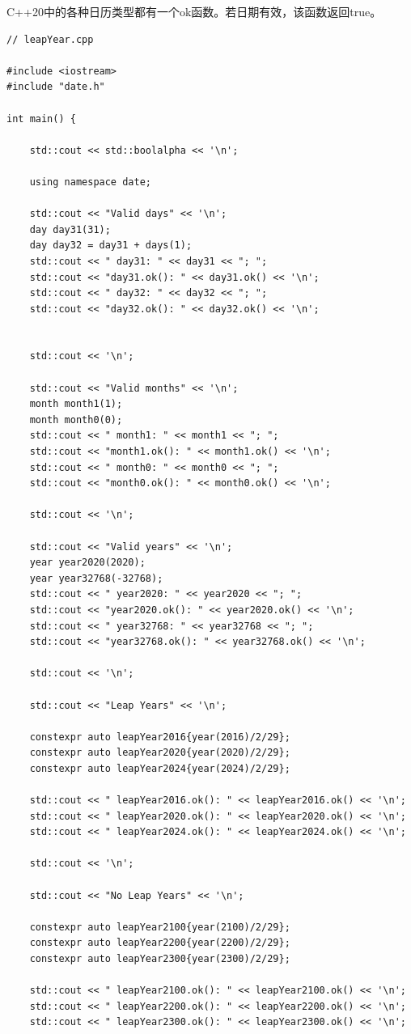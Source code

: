 C++20中的各种日历类型都有一个ok函数。若日期有效，该函数返回true。

\begin{lstlisting}[style=styleCXX]
// leapYear.cpp

#include <iostream>
#include "date.h"

int main() {
	
	std::cout << std::boolalpha << '\n';
	
	using namespace date;
	
	std::cout << "Valid days" << '\n';
	day day31(31);
	day day32 = day31 + days(1);
	std::cout << " day31: " << day31 << "; ";
	std::cout << "day31.ok(): " << day31.ok() << '\n';
	std::cout << " day32: " << day32 << "; ";
	std::cout << "day32.ok(): " << day32.ok() << '\n';
	
	
	std::cout << '\n';
	
	std::cout << "Valid months" << '\n';
	month month1(1);
	month month0(0);
	std::cout << " month1: " << month1 << "; ";
	std::cout << "month1.ok(): " << month1.ok() << '\n';
	std::cout << " month0: " << month0 << "; ";
	std::cout << "month0.ok(): " << month0.ok() << '\n';
	
	std::cout << '\n';
	
	std::cout << "Valid years" << '\n';
	year year2020(2020);
	year year32768(-32768);
	std::cout << " year2020: " << year2020 << "; ";
	std::cout << "year2020.ok(): " << year2020.ok() << '\n';
	std::cout << " year32768: " << year32768 << "; ";
	std::cout << "year32768.ok(): " << year32768.ok() << '\n';
	
	std::cout << '\n';
	
	std::cout << "Leap Years" << '\n';
	
	constexpr auto leapYear2016{year(2016)/2/29};
	constexpr auto leapYear2020{year(2020)/2/29};
	constexpr auto leapYear2024{year(2024)/2/29};
	
	std::cout << " leapYear2016.ok(): " << leapYear2016.ok() << '\n';
	std::cout << " leapYear2020.ok(): " << leapYear2020.ok() << '\n';
	std::cout << " leapYear2024.ok(): " << leapYear2024.ok() << '\n';
	
	std::cout << '\n';
	
	std::cout << "No Leap Years" << '\n';
	
	constexpr auto leapYear2100{year(2100)/2/29};
	constexpr auto leapYear2200{year(2200)/2/29};
	constexpr auto leapYear2300{year(2300)/2/29};
	
	std::cout << " leapYear2100.ok(): " << leapYear2100.ok() << '\n';
	std::cout << " leapYear2200.ok(): " << leapYear2200.ok() << '\n';
	std::cout << " leapYear2300.ok(): " << leapYear2300.ok() << '\n';
	

\end{lstlisting}
